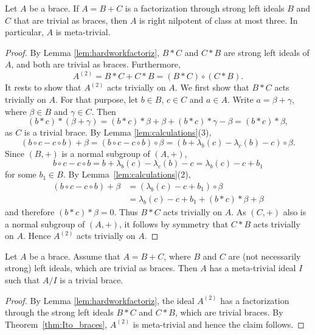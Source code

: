 \begin{theorem} 
\label{thm:Ito_braces}
Let $A$ be a brace. If $A=B+C$ is a factorization through strong left ideals $B$ and $C$ that are trivial as  braces,
then $A$ is right nilpotent of class at most three. In particular, $A$ is meta-trivial.
\end{theorem}

\begin{proof}
By Lemma \ref{lem:hardworkfactoriz}, $B*C$ and $C*B$ are strong left ideals of $A$, and both are trivial as  braces. Furthermore, 
\[
A^{(2)} = B*C + C*B = (B*C) \circ (C*B).
\]
It rests to show that $A^{(2)}$ acts trivially on $A$. We first show that $B*C$ acts trivially on $A$. For that purpose, 
let $b\in B$, $c\in C$ and $a\in A$. Write $a=\beta+\gamma$, where $\beta\in B$ and $\gamma\in C$. Then
\[
(b*c)*(\beta+\gamma)=(b*c)*\beta+\beta+(b*c)*\gamma-\beta=(b*c)*\beta, 
\]
as $C$ is a trivial brace. By Lemma \ref{lem:calculations}(3), 
\[
(b\circ c - c\circ b) + \beta = (b\circ c - c \circ b) \circ \beta = (b + \lambda_b(c) - \lambda_c(b) - c) \circ \beta.
\]
Since $(B,+)$ is a normal subgroup of $(A,+)$, 
\[
b\circ c-c\circ b=b+\lambda_b(c)-\lambda_c(b)-c=\lambda_b(c)-c+b_1
\]
for some $b_1\in B$. By Lemma~\ref{lem:calculations}(2), 
\begin{align*}
    (b\circ c - c\circ b) + \beta & =(\lambda_b(c) - c + b_1) \circ \beta\\
                                  & =\lambda_b(c) - c + b_1 + (b*c)*\beta + \beta
\end{align*}
and therefore $(b*c)*\beta = 0$. Thus $B*C$ acts trivially on $A$. As $(C,+)$ also is a normal subgroup of $(A,+)$,
it follows by symmetry that $C*B$ acts trivially on $A$. Hence $A^{(2)}$ acts trivially on $A$.
\end{proof}

\begin{corollary}
    Let $A$ be a brace. Assume that $A= B + C$, where $B$ and $C$ are (not necessarily strong) left ideals,
    which are trivial as braces. Then $A$ has a meta-trivial ideal $I$ such that $A/I$ is a trivial brace.
\end{corollary}

\begin{proof}
    By Lemma \ref{lem:hardworkfactoriz}, the ideal $A^{(2)}$ has a factorization through the strong left ideals $B*C$ and $C*B$,
    which are trivial braces. By Theorem~\ref{thm:Ito_braces}, $A^{(2)}$ is meta-trivial and hence the claim follows.
\end{proof}

